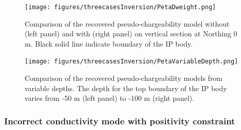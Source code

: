 \documentclass[a4paper, 11pt]{article}
\newcommand{\peta}{\tilde{\eta}}
\newcommand{\dip}{d^{IP}}
\begin{document}
\begin{figure}[htb]
  \centering \texttt{[image: figures/threecasesInversion/PetaDweight.png]}
  \caption{Comparison of the recovered pseudo-chargeability model without (left panel) and with (right panel) on vertical section at Northing 0 m. Black solid line indicate boundary of the IP body.}
  \label{F:PetaDweight}
\end{figure}


\begin{figure}[htb]
  \centering \texttt{[image: figures/threecasesInversion/PetaVariableDepth.png]}
  \caption{Comparison of the recovered pseudo-chargeability models from variable depths. The depth for the top boundary of the IP body varies from -50 m (left panel) to -100 m (right panel). }
  \label{F:PetaVariableDepth}
\end{figure}
\clearpage


\subsubsection{Incorrect conductivity mode with positivity constraint}
\end{document}
